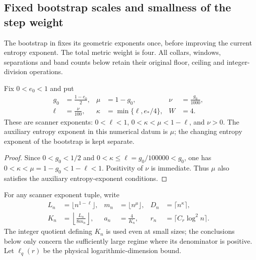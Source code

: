\subsection{Fixed bootstrap scales and smallness of the step weight}
\label{sec:bootstrap_scanner_numerics}

The bootstrap in \cite{OpenAI2026AreaLaw} fixes its geometric exponents
once, before improving the current entropy exponent.
The total metric weight is four.
All collars, windows, separations and band counts below retain their
original floor, ceiling and integer-division operations.

\begin{definition}
    \label{def:bootstrap_scanner_exponents}
    \leanok
    Fix $0<e_0<1$ and put
    \begin{align}
        g_0  & =\frac{1-e_0}{2},
             & \mu               & =1-g_0,
             & \nu               & =\frac{g_0}{1000},\nonumber \\
        \ell & =\frac{\nu}{100},
             & \kappa            & =\min\{\ell,e_*/4\},
             & W                 & =4.
        \label{eq:bootstrap_scanner_exponents}
    \end{align}
    These are scanner exponents:
    $0<\ell<1$, $0<\kappa<\mu<1-\ell$, and $\nu>0$.
    The auxiliary entropy exponent in this numerical datum is $\mu$;
    the changing entropy exponent of the bootstrap is kept separate.
\end{definition}
\begin{proof}
    \leanok
    Since $0<g_0<1/2$ and
    $0<\kappa\leq\ell=g_0/100000<g_0$, one has
    $0<\kappa<\mu=1-g_0<1-\ell<1$.
    Positivity of $\nu$ is immediate.
    Thus $\mu$ also satisfies the auxiliary entropy-exponent conditions.
\end{proof}

For any scanner exponent tuple, write
\begin{align}
    L_n & =\lfloor n^{1-\ell}\rfloor,
        & m_n                                         & =\lfloor n^\mu\rfloor,
        & D_n                                         & =\lceil n^\kappa\rceil,\nonumber \\
    K_n & =\left\lfloor\frac{L_n}{8m_n}\right\rfloor,
        & a_n                                         & =\frac4{K_n},
        & r_n                                         & =\lceil C_r\log^2 n\rceil.
    \label{eq:bootstrap_scanner_rounded_scales}
\end{align}
The integer quotient defining $K_n$ is used even at small sizes;
the conclusions below only concern the sufficiently large regime where
its denominator is positive.
Let $\ell_q(r)$ be the physical logarithmic-dimension bound.

